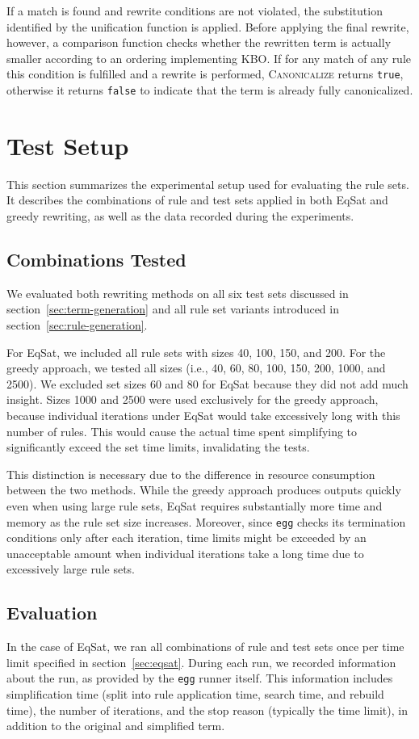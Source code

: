If a match is found and rewrite conditions are not violated, the substitution identified by the unification function is applied. Before applying the final rewrite, however, a comparison function checks whether the rewritten term is actually smaller according to an ordering implementing KBO. If for any match of any rule this condition is fulfilled and a rewrite is performed, \textsc{Canonicalize} returns \texttt{true}, otherwise it returns \texttt{false} to indicate that the term is already fully canonicalized.

\section{Test Setup}
\label{sec:test-setup}

This section summarizes the experimental setup used for evaluating the rule sets. It describes the combinations of rule and test sets applied in both EqSat and greedy rewriting, as well as the data recorded during the experiments.

\subsection{Combinations Tested}
We evaluated both rewriting methods on all six test sets discussed in section~\ref{sec:term-generation} and all rule set variants introduced in section~\ref{sec:rule-generation}.

For EqSat, we included all rule sets with sizes 40, 100, 150, and 200. For the greedy approach, we tested all sizes (i.e., 40, 60, 80, 100, 150, 200, 1000, and 2500). We excluded set sizes 60 and 80 for EqSat because they did not add much insight. Sizes 1000 and 2500 were used exclusively for the greedy approach, because individual iterations under EqSat would take excessively long with this number of rules. This would cause the actual time spent simplifying to significantly exceed the set time limits, invalidating the tests.

This distinction is necessary due to the difference in resource consumption between the two methods. While the greedy approach produces outputs quickly even when using large rule sets, EqSat requires substantially more time and memory as the rule set size increases. Moreover, since \texttt{egg} checks its termination conditions only after each iteration, time limits might be exceeded by an unacceptable amount when individual iterations take a long time due to excessively large rule sets.

\subsection{Evaluation}
In the case of EqSat, we ran all combinations of rule and test sets once per time limit specified in section~\ref{sec:eqsat}. During each run, we recorded information about the run, as provided by the \texttt{egg} runner itself. This information includes simplification time (split into rule application time, search time, and rebuild time), the number of iterations, and the stop reason (typically the time limit), in addition to the original and simplified term. 

